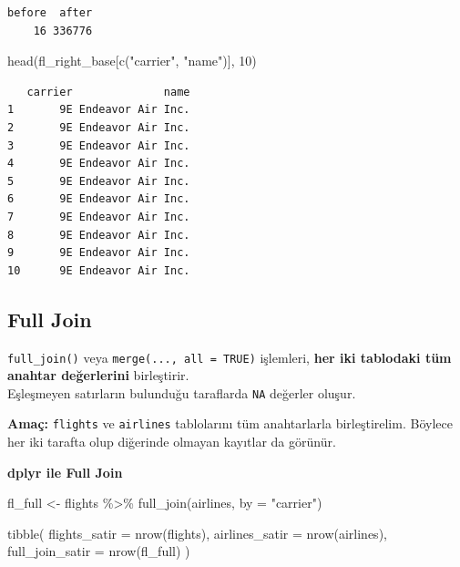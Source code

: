\documentclass[
  letterpaper,
  DIV=11,
  numbers=noendperiod]{scrreprt}
\newenvironment{Shaded}{\begin{snugshade}}{\end{snugshade}}
\newcommand{\AttributeTok}[1]{\textcolor[rgb]{0.40,0.45,0.13}{#1}}
\newcommand{\DecValTok}[1]{\textcolor[rgb]{0.68,0.00,0.00}{#1}}
\newcommand{\FunctionTok}[1]{\textcolor[rgb]{0.28,0.35,0.67}{#1}}
\newcommand{\NormalTok}[1]{\textcolor[rgb]{0.00,0.23,0.31}{#1}}
\newcommand{\OtherTok}[1]{\textcolor[rgb]{0.00,0.23,0.31}{#1}}
\newcommand{\SpecialCharTok}[1]{\textcolor[rgb]{0.37,0.37,0.37}{#1}}
\newcommand{\StringTok}[1]{\textcolor[rgb]{0.13,0.47,0.30}{#1}}
\begin{document}
\begin{verbatim}
before  after 
    16 336776 
\end{verbatim}

\begin{Shaded}
\begin{Highlighting}[]
\FunctionTok{head}\NormalTok{(fl\_right\_base[}\FunctionTok{c}\NormalTok{(}\StringTok{"carrier"}\NormalTok{, }\StringTok{"name"}\NormalTok{)], }\DecValTok{10}\NormalTok{)}
\end{Highlighting}
\end{Shaded}

\begin{verbatim}
   carrier              name
1       9E Endeavor Air Inc.
2       9E Endeavor Air Inc.
3       9E Endeavor Air Inc.
4       9E Endeavor Air Inc.
5       9E Endeavor Air Inc.
6       9E Endeavor Air Inc.
7       9E Endeavor Air Inc.
8       9E Endeavor Air Inc.
9       9E Endeavor Air Inc.
10      9E Endeavor Air Inc.
\end{verbatim}

\subsection*{Full Join}\label{full-join}

\texttt{full\_join()} veya \texttt{merge(...,\ all\ =\ TRUE)} işlemleri,
\textbf{her iki tablodaki tüm anahtar değerlerini} birleştirir.\\
Eşleşmeyen satırların bulunduğu taraflarda \texttt{NA} değerler oluşur.

\textbf{Amaç:} \texttt{flights} ve \texttt{airlines} tablolarını tüm
anahtarlarla birleştirelim. Böylece her iki tarafta olup diğerinde
olmayan kayıtlar da görünür.

\textbf{dplyr ile Full Join}

\begin{Shaded}
\begin{Highlighting}[]
\NormalTok{fl\_full }\OtherTok{\textless{}{-}}\NormalTok{ flights }\SpecialCharTok{\%\textgreater{}\%}
\FunctionTok{full\_join}\NormalTok{(airlines, }\AttributeTok{by =} \StringTok{"carrier"}\NormalTok{)}

\FunctionTok{tibble}\NormalTok{(}
\AttributeTok{flights\_satir =} \FunctionTok{nrow}\NormalTok{(flights),}
\AttributeTok{airlines\_satir =} \FunctionTok{nrow}\NormalTok{(airlines),}
\AttributeTok{full\_join\_satir =} \FunctionTok{nrow}\NormalTok{(fl\_full)}
\NormalTok{)}
\end{Highlighting}
\end{Shaded}
\end{document}
